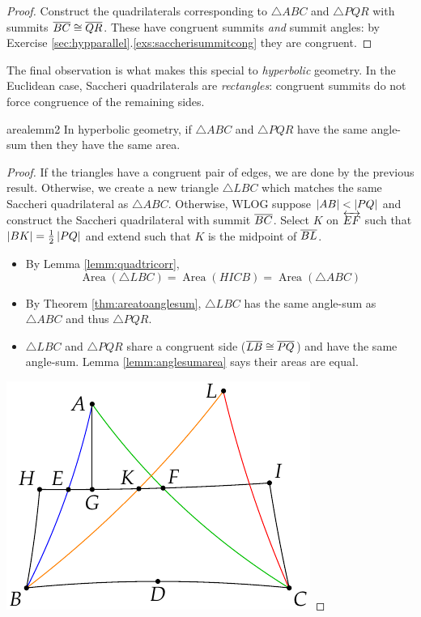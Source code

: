 \begin{proof}
Construct the quadrilaterals corresponding to $\triangle ABC$ and $\triangle PQR$ with summits $\overline{BC}\cong\overline{QR}$. These have congruent summits \emph{and} summit angles: by Exercise \ref*{sec:hypparallel}.\ref{exs:saccherisummitcong} they are congruent.
\end{proof}

The final observation is what makes this special to \emph{hyperbolic} geometry. In the Euclidean case, Saccheri quadrilaterals are \emph{rectangles}: congruent summits do not force congruence of the remaining sides.\goodbreak

\begin{thm}{}{arealemm2}
In hyperbolic geometry, if $\triangle ABC$ and $\triangle PQR$ have the same angle-sum then they have the same area.
\end{thm}

\begin{proof}
If the triangles have a congruent pair of edges, we are done by the previous result. Otherwise, we create a new triangle $\triangle LBC$ which matches the same Saccheri quadrilateral as $\triangle ABC$.\smallbreak
Otherwise, WLOG suppose $\left| AB\right|<\left| PQ\right|$ and construct the Saccheri quadrilateral with summit $\overline{BC}$. Select $K$ on $\overleftrightarrow{EF}$ such that $\left| BK\right|=\frac 12\left| PQ\right|$ and extend such that $K$ is the midpoint of $\overline{BL}$.\par
\begin{minipage}[t]{0.6\linewidth}\vspace{0pt}
\begin{itemize}
  \item By Lemma \ref{lemm:quadtricorr},
  \[\operatorname{Area}(\triangle LBC)=\operatorname{Area}(HICB)=\operatorname{Area}(\triangle ABC)\]
  \item By Theorem \ref{thm:areatoanglesum}, $\triangle LBC$ has the same angle-sum as $\triangle ABC$ and thus $\triangle PQR$.
  \item $\triangle LBC$ and $\triangle PQR$ share a congruent side ($\overline{LB}\cong\overline{PQ}$) and have the same angle-sum. Lemma \ref{lemm:anglesumarea} says their areas are equal.
\end{itemize}
\end{minipage}\hfill\begin{minipage}[t]{0.39\linewidth}\vspace{-12pt}
\flushright\includegraphics{area-saccheri9}\qedhere
\end{minipage}
\end{proof}

